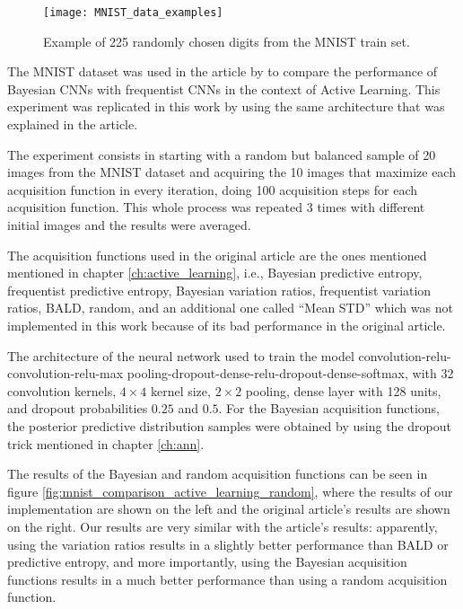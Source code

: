 \begin{figure}[H]
    \centering
    \texttt{[image: MNIST\_data\_examples]}
    \caption{Example of 225 randomly chosen digits from the MNIST train set.}
    \label{fig:MNIST_data_examples}
\end{figure}

The MNIST dataset was used in the article  by \citeauthor{Gal2016Active} to compare the performance of Bayesian CNNs with frequentist CNNs in the context of Active Learning. This experiment was replicated in this work by using the same architecture that was explained in the article.

The experiment consists in starting with a random but balanced sample of 20 images from the MNIST dataset and acquiring the 10 images that maximize each acquisition function in every iteration, doing 100 acquisition steps for each acquisition function. This whole process was repeated 3 times with different initial images and the results were averaged.

The acquisition functions used in the original article are the ones mentioned mentioned in chapter \ref{ch:active_learning}, i.e., Bayesian predictive entropy, frequentist predictive entropy, Bayesian variation ratios, frequentist variation ratios, BALD, random, and an additional one called ``Mean STD'' which was not implemented in this work because of its bad performance in the original article.

The architecture of the neural network used to train the model convolution-relu-convolution-relu-max pooling-dropout-dense-relu-dropout-dense-softmax, with 32 convolution kernels, $4 \times 4$ kernel size, $2 \times 2$ pooling, dense layer with 128 units, and dropout probabilities $0.25$ and $0.5$. For the Bayesian acquisition functions, the posterior predictive distribution samples were obtained by using the dropout trick mentioned in chapter \ref{ch:ann}.

The results of the Bayesian and random acquisition functions can be seen in figure \ref{fig:mnist_comparison_active_learning_random}, where the results of our implementation are shown on the left and the original article's results are shown on the right. Our results are very similar with the article's results: apparently, using the variation ratios results in a slightly better performance than BALD or predictive entropy, and more importantly, using the Bayesian acquisition functions results in a much better performance than using a random acquisition function.

